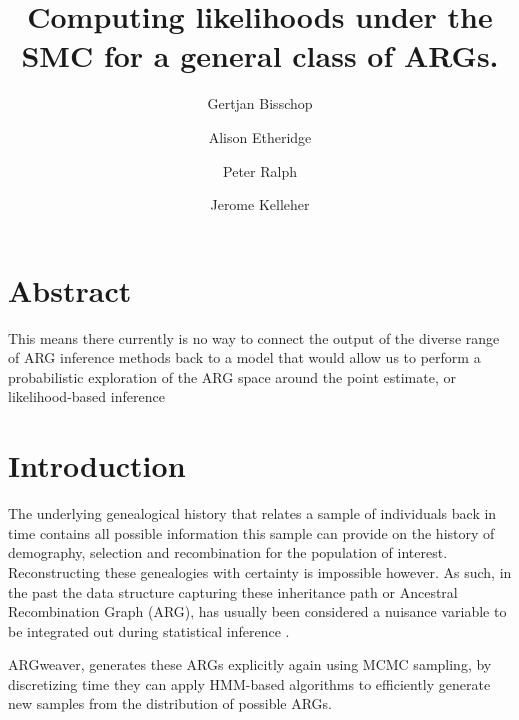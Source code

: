 \documentclass{article}
\begin{document}
\linenumbers
\title{Computing likelihoods under the SMC for a general class of ARGs.}

\author[1, $\dagger$]{Gertjan Bisschop}

\author[2]{Alison Etheridge}
\author[3]{Peter Ralph}

\author[1]{Jerome Kelleher}

\maketitle


\section{Abstract}
This means there currently is no way to connect the output of the diverse 
range of ARG inference methods back 
to a model that would allow us to perform a probabilistic exploration of the 
ARG space around the point estimate, or likelihood-based inference

\section{Introduction}

The underlying genealogical history that relates a sample of individuals back in time
contains all possible information this sample can provide on the history of demography, 
selection and recombination for the population of interest. 
Reconstructing these genealogies with certainty is impossible however. 
As such, in the past the data structure capturing these inheritance path 
or Ancestral Recombination Graph (ARG), has usually been considered a nuisance 
variable to be integrated out during statistical inference 
\citep{kuhner_2000, griffiths_ancestral_1996}.

ARGweaver, generates these ARGs explicitly again using MCMC sampling, by discretizing time 
they can apply HMM-based algorithms to efficiently generate new samples from the distribution of 
possible ARGs.

\end{document}
